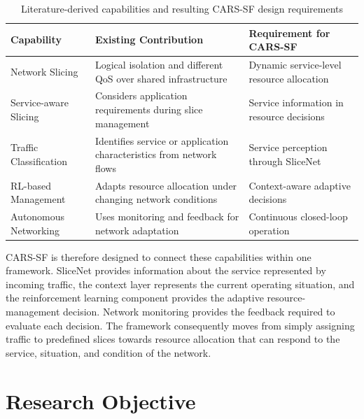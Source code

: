 \documentclass[12pt,a4paper]{report}
\begin{document}
\begin{table}[H]
	\centering
	\caption{Literature-derived capabilities and resulting CARS-SF
		design requirements}
	\label{tab:literature_gap}
	\begin{tabular}{p{3.0cm} p{4.3cm} p{4.3cm}}
		\toprule
		\textbf{Capability} &
		\textbf{Existing Contribution} &
		\textbf{Requirement for CARS-SF} \\
		\midrule
		
		Network Slicing &
		Logical isolation and different QoS over shared infrastructure
		\cite{kazmi2019slicing} &
		Dynamic service-level resource allocation \\
		
		Service-aware Slicing &
		Considers application requirements during slice management
		 &
		Service information in resource decisions \\
		
		Traffic Classification &
		Identifies service or application characteristics from network flows
		\cite{xie2021traffic,mohammedali2022traffic} &
		Service perception through SliceNet \\
		
		RL-based Management &
		Adapts resource allocation under changing network conditions
		\cite{li2018drl,sciancalepore2019rlnsb} &
		Context-aware adaptive decisions \\
		
		Autonomous Networking &
		Uses monitoring and feedback for network adaptation
		\cite{moysen2018selforganized} &
		Continuous closed-loop operation \\
		
		\bottomrule
	\end{tabular}
\end{table}



CARS-SF is therefore designed to connect these capabilities within one
framework. SliceNet provides information about the service represented
by incoming traffic, the context layer represents the current operating
situation, and the reinforcement learning component provides the
adaptive resource-management decision. Network monitoring provides the
feedback required to evaluate each decision. The framework consequently
moves from simply assigning traffic to predefined slices towards
resource allocation that can respond to the service, situation, and
condition of the network.
\section{Research Objective}
\label{sec:research_objective}
\end{document}
